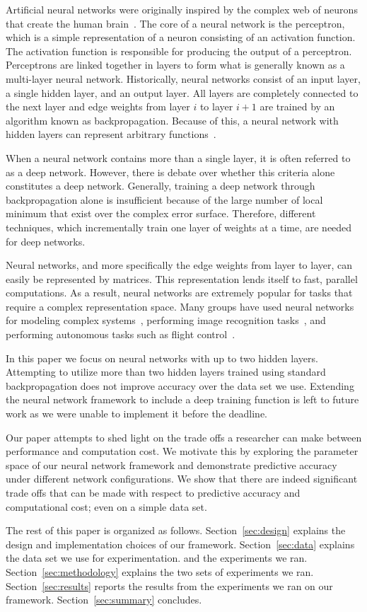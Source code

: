 Artificial neural networks were originally inspired by the complex web of neurons that create the human brain~\cite{mitchell1997artificial}.
The core of a neural network is the perceptron, which is a simple representation of a neuron consisting of an activation function.
The activation function is responsible for producing the output of a perceptron.
Perceptrons are linked together in layers to form what is generally known as a multi-layer neural network.
Historically, neural networks consist of an input layer, a single hidden layer, and an output layer.
All layers are completely connected to the next layer and edge weights from layer \(i\) to layer \(i+1\) are trained by an algorithm known as backpropagation.
Because of this, a neural network with hidden layers can represent arbitrary functions~\cite{markcraven2014}.

When a neural network contains more than a single layer, it is often referred to as a deep network.
However, there is debate over whether this criteria alone constitutes a deep network.
Generally, training a deep network through backpropagation alone is insufficient because of the large number of local minimum that exist over the complex error surface.
Therefore, different techniques, which incrementally train one layer of weights at a time, are needed for deep networks.

Neural networks, and more specifically the edge weights from layer to layer, can easily be represented by matrices.
This representation lends itself to fast, parallel computations.
As a result, neural networks are extremely popular for tasks that require a complex representation space.
Many groups have used neural networks for modeling complex systems~\cite{Goh1995143}, performing image recognition tasks~\cite{alvira2001}, and performing autonomous tasks such as flight control~\cite{kim1997nonlinear}.

In this paper we focus on neural networks with up to two hidden layers.
Attempting to utilize more than two hidden layers trained using standard backpropagation does not improve accuracy over the data set we use.
Extending the neural network framework to include a deep training function is left to future work as we were unable to implement it before the deadline.

Our paper attempts to shed light on the trade offs a researcher can make between performance and computation cost.
We motivate this by exploring the parameter space of our neural network framework and demonstrate predictive accuracy under different network configurations.
We show that there are indeed significant trade offs that can be made with respect to predictive accuracy and computational cost; even on a simple data set.

The rest of this paper is organized as follows.
Section~\ref{sec:design} explains the design and implementation choices of our framework.
Section~\ref{sec:data} explains the data set we use for experimentation. and the experiments we ran.
Section~\ref{sec:methodology} explains the two sets of experiments we ran.
Section~\ref{sec:results} reports the results from the experiments we ran on our framework.
Section~\ref{sec:summary} concludes.
